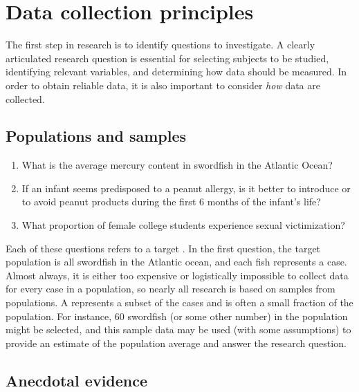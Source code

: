 \section{Data collection principles}
\label{dataCollectionPrinciples}


The first step in research is to identify questions to investigate. A clearly articulated research question is essential for selecting subjects to be studied, identifying relevant variables, and determining how data should be measured. In order to obtain reliable data, it is also important to consider \textit{how} data are collected.

\subsection{Populations and samples}
\label{populationsAndSamples}

\begin{enumerate}
\setlength{\itemsep}{0mm}

\item What is the average mercury content in swordfish in the Atlantic Ocean?

\item If an infant seems predisposed to a peanut allergy, is it better to introduce or to avoid peanut products during the first 6 months of the infant's life?

\item What proportion of female college students experience sexual victimization?

\end{enumerate}

Each of these questions refers to a target . In the first question, the target population is all swordfish in the Atlantic ocean, and each fish represents a case. Almost always, it is either too expensive or logistically impossible to collect data for every case in a population, so nearly all research is based on samples from populations. A  represents a subset of the cases and is often a small fraction of the population. For instance, 60 swordfish (or some other number) in the population might be selected, and this sample data may be used (with some assumptions) to provide an estimate of the population average and answer the research question.



\subsection{Anecdotal evidence}
\label{anecdotalEvidence}

